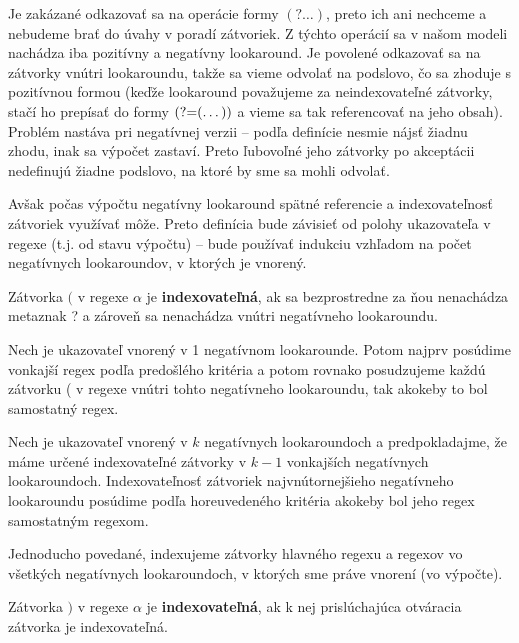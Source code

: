 Je zakázané odkazovať sa na operácie formy $(?\dots )$, preto ich ani nechceme a nebudeme brať do úvahy v poradí zátvoriek. Z týchto operácií sa v našom modeli nachádza iba pozitívny a negatívny lookaround. Je povolené odkazovať sa na zátvorky vnútri lookaroundu, takže sa vieme odvolať na podslovo, čo sa zhoduje s pozitívnou formou (keďže lookaround považujeme za neindexovateľné zátvorky, stačí ho prepísať do formy $\text{(?=} (\dots ))$ a vieme sa tak referencovať na jeho obsah). Problém nastáva pri negatívnej verzii -- podľa definície nesmie nájsť žiadnu zhodu, inak sa výpočet zastaví. Preto ľubovoľné jeho zátvorky po akceptácii nedefinujú žiadne podslovo, na ktoré by sme sa mohli odvolať.

Avšak počas výpočtu negatívny lookaround spätné referencie a indexovateľnosť zátvoriek využívať môže. Preto definícia bude závisieť od polohy ukazovateľa v regexe (t.j. od stavu výpočtu) -- bude používať indukciu vzhľadom na počet negatívnych lookaroundov, v ktorých je vnorený.

\begin{df}\label{indexovatelnost_(}
Zátvorka $($ v regexe $\alpha$ je \textbf{indexovateľná}, ak sa bezprostredne za ňou nenachádza metaznak ? a zároveň sa nenachádza vnútri negatívneho lookaroundu.

Nech je ukazovateľ vnorený v 1 negatívnom lookarounde. Potom najprv posúdime vonkajší regex podľa  predošlého kritéria a potom rovnako posudzujeme každú zátvorku ( v regexe vnútri tohto negatívneho look\-aroundu, tak akokeby to bol samostatný regex.

Nech je ukazovateľ vnorený v $k$ negatívnych lookaroundoch a predpokladajme, že máme určené indexovateľné zátvorky v $k-1$ vonkajších negatívnych lookaroundoch. Indexovateľnosť zátvoriek najvnútornejšieho negatívneho lookaroundu posúdime podľa horeuvedeného kritéria akokeby bol jeho regex samostatným regexom.
\end{df}

Jednoducho povedané, indexujeme zátvorky hlavného regexu a regexov vo všetkých negatívnych lookaroundoch, v ktorých sme práve vnorení (vo výpočte).

\begin{df}\label{indexovatelnost_)}
Zátvorka $)$ v regexe $\alpha$ je \textbf{indexovateľná}, ak k nej prislúchajúca otváracia zátvorka je indexovateľná.
\end{df}

